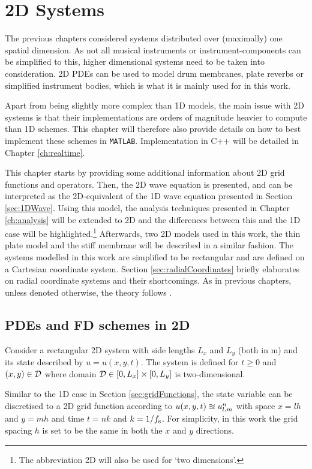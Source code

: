 \chapter{2D Systems}\label{ch:2Dsyst}
The previous chapters considered systems distributed over (maximally) one spatial dimension. As not all musical instruments or instrument-components can be simplified to this, higher dimensional systems need to be taken into consideration. 2D PDEs can be used to model drum membranes, plate reverbs or simplified instrument bodies, which is what it is mainly used for in this work. 

Apart from being slightly more complex than 1D models, the main issue with 2D systems is that their implementations are orders of magnitude heavier to compute than 1D schemes. This chapter will therefore also provide details on how to best implement these schemes in \texttt{MATLAB}. Implementation in C++ will be detailed in Chapter \ref{ch:realtime}.

This chapter starts by providing some additional information about 2D grid functions and operators. Then, the 2D wave equation is presented, and can be interpreted as the 2D-equivalent of the 1D wave equation presented in Section \ref{sec:1DWave}. Using this model, the analysis techniques presented in Chapter \ref{ch:analysis} will be extended to 2D and the differences between this and the 1D case will be highlighted.\footnote{The abbreviation 2D will also be used for `two dimensions'.} Afterwards, two 2D models used in this work, the thin plate model and the stiff membrane will be described in a similar fashion.
The systems modelled in this work are simplified to be rectangular and are defined on a Cartesian coordinate system. Section \ref{sec:radialCoordinates} briefly elaborates on radial coordinate systems and their shortcomings. 
As in previous chapters, unless denoted otherwise, the theory follows \cite{theBible}.

\section{PDEs and FD schemes in 2D}
Consider a rectangular 2D system with side lengths $L_x$ and $L_y$ (both in m) and its state described by $u = u(x,y,t)$. The system is defined for $t\geq 0$ and $(x,y) \in \mathcal{D}$ where domain $\mathcal{D} \in [0, L_x]\times [0, L_y]$ is two-dimensional. 

Similar to the 1D case in Section \ref{sec:gridFunctions}, the state variable can be discretised to a 2D grid function according to $u(x, y, t) \approxeq u_{l,m}^n$ with space $x = lh$ and $y = mh$ and time $t = nk$ and $k=1/f_\text{s}$. For simplicity, in this work the grid spacing $h$ is set to be the same in both the $x$ and $y$ directions.


